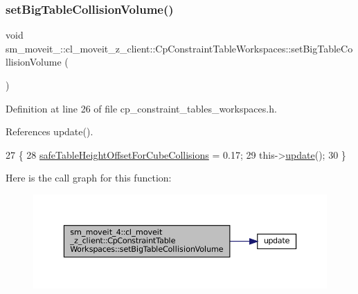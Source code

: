 \subsubsection{\texorpdfstring{set\+Big\+Table\+Collision\+Volume()}{setBigTableCollisionVolume()}}
{\footnotesize\ttfamily void sm\+\_\+moveit\+\_\+::cl\+\_\+moveit\+\_\+z\+\_\+client\+::\+Cp\+Constraint\+Table\+Workspaces\+::set\+Big\+Table\+Collision\+Volume (\begin{DoxyParamCaption}{ }\end{DoxyParamCaption})\hspace{0.3cm}{\ttfamily [inline]}}



Definition at line 26 of file cp\+\_\+constraint\+\_\+tables\+\_\+workspaces.\+h.



References update().


\begin{DoxyCode}
27             \{
28                 \hyperlink{classsm__moveit__4_1_1cl__moveit__z__client_1_1CpConstraintTableWorkspaces_a8c9bd78c8330ae1446e5bc4d2891e285}{safeTableHeightOffsetForCubeCollisions} = 0.17;
29                 this->\hyperlink{classsm__moveit__4_1_1cl__moveit__z__client_1_1CpConstraintTableWorkspaces_ae0b53f2cceedd97e053e66b1df2d9486}{update}();
30             \}
\end{DoxyCode}
Here is the call graph for this function\+:
\nopagebreak
\begin{figure}[H]
\begin{center}
\leavevmode
\includegraphics[width=350pt]{classsm__moveit__4_1_1cl__moveit__z__client_1_1CpConstraintTableWorkspaces_ac27a48c21b8b476b426b0bf9d7000c8b_cgraph}
\end{center}
\end{figure}
\mbox{\label{classsm__moveit__4_1_1cl__moveit__z__client_1_1CpConstraintTableWorkspaces_a8652bbff65de57c74d8ce4da01ea2484}} 

